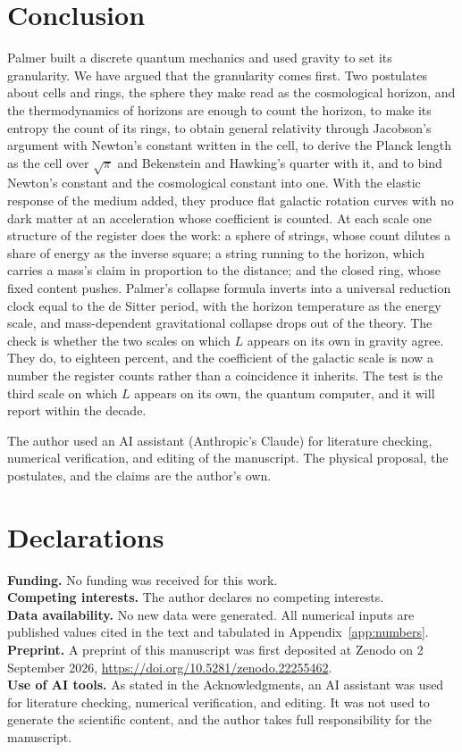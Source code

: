 \documentclass[aps,prd,twocolumn,superscriptaddress,nofootinbib,showkeys]{revtex4-2}
\begin{document}
\section{Conclusion}

Palmer built a discrete quantum mechanics and used gravity to set its granularity. We have argued that the granularity comes first. Two postulates about cells and rings, the sphere they make read as the cosmological horizon, and the thermodynamics of horizons are enough to count the horizon, to make its entropy the count of its rings, to obtain general relativity through Jacobson's argument with Newton's constant written in the cell, to derive the Planck length as the cell over $\sqrt\pi$ and Bekenstein and Hawking's quarter with it, and to bind Newton's constant and the cosmological constant into one. With the elastic response of the medium added, they produce flat galactic rotation curves with no dark matter at an acceleration whose coefficient is counted. At each scale one structure of the register does the work: a sphere of strings, whose count dilutes a share of energy as the inverse square; a string running to the horizon, which carries a mass's claim in proportion to the distance; and the closed ring, whose fixed content pushes. Palmer's collapse formula inverts into a universal reduction clock equal to the de Sitter period, with the horizon temperature as the energy scale, and mass-dependent gravitational collapse drops out of the theory. The check is whether the two scales on which $L$ appears on its own in gravity agree. They do, to eighteen percent, and the coefficient of the galactic scale is now a number the register counts rather than a coincidence it inherits. The test is the third scale on which $L$ appears on its own, the quantum computer, and it will report within the decade.

\begin{acknowledgments}
The author used an AI assistant (Anthropic's Claude) for literature checking, numerical verification, and editing of the manuscript. The physical proposal, the postulates, and the claims are the author's own.
\end{acknowledgments}

\section*{Declarations}
\noindent\textbf{Funding.} No funding was received for this work.\\
\textbf{Competing interests.} The author declares no competing interests.\\
\textbf{Data availability.} No new data were generated. All numerical inputs are published values cited in the text and tabulated in Appendix~\ref{app:numbers}.\\
\textbf{Preprint.} A preprint of this manuscript was first deposited at Zenodo on 2 September 2026, \url{https://doi.org/10.5281/zenodo.22255462}.\\
\textbf{Use of AI tools.} As stated in the Acknowledgments, an AI assistant was used for literature checking, numerical verification, and editing. It was not used to generate the scientific content, and the author takes full responsibility for the manuscript.
\end{document}
